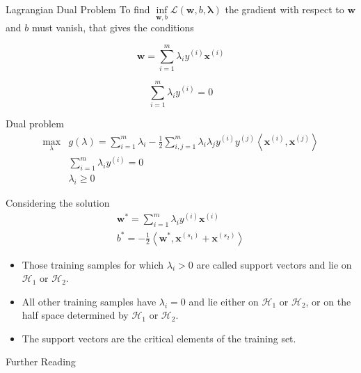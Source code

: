 \documentclass{beamer}
\begin{document}
\begin{frame}{Lagrangian Dual Problem}
    To find $\inf\limits_{\mathbf{w}, b} \mathcal{L} (\mathbf{w}, b, \mathbf{\lambda})$
    the gradient with respect to $\mathbf{w}$ and $b$ must vanish, that gives the
    conditions

    \begin{equation}
        \mathbf{w} = \sum\limits^m_{i=1} \lambda_i y^{(i)} \mathbf{x}^{(i)}
        \label{cond1}
    \end{equation}

    \begin{equation}
        \sum\limits^m_{i=1} \lambda_i y^{(i)} = 0
        \label{cond2}
    \end{equation}
    

    \begin{block}{Dual problem}
        \begin{equation}
            \begin{array}{ll}
                \max_\lambda & g(\lambda) = \sum\limits^m_{i=1} \lambda_i -
                \frac{1}{2} \sum\limits^m_{i,j=1} \lambda_i \lambda_j y^{(i)} y^{(j)}
                \left< \mathbf{x}^{(i)}, \mathbf{x}^{(j)} \right> \\[.2cm]
                & \sum\limits^m_{i=1} \lambda_i y^{(i)} = 0 \\[.2cm]
                & \lambda_i \ge 0
            \end{array}
        \end{equation}
    \end{block}
\end{frame}


\begin{frame}
    Considering the solution 
    $$
    \begin{array}{l}
        \mathbf{w}^* = \sum\limits^m_{i=1} \lambda_i y^{(i)}
        \mathbf{x}^{(i)} \\[.4cm]
        b^* = - \frac{1}{2} \left< \mathbf{w}^*, \mathbf{x}^{(s_1)} + \mathbf{x}^{(s_2)}
        \right>
    \end{array}
    $$

    \begin{itemize} 
        \item Those training samples for which $\lambda_i > 0$ are called \alert{support
            vectors} and lie on $\mathcal{H}_1$ or $\mathcal{H}_2$.
        \item All other training samples have $\lambda_i = 0$ and lie either on
            $\mathcal{H}_1$ or $\mathcal{H}_2$, or on the half space determined by
            $\mathcal{H}_1$ or $\mathcal{H}_2$.
        \item The support vectors are the \alert{critical elements} of the training set.
    \end{itemize} 
    
\end{frame}


\begin{frame}{Further Reading}
    
    
\end{frame}
\end{document}
